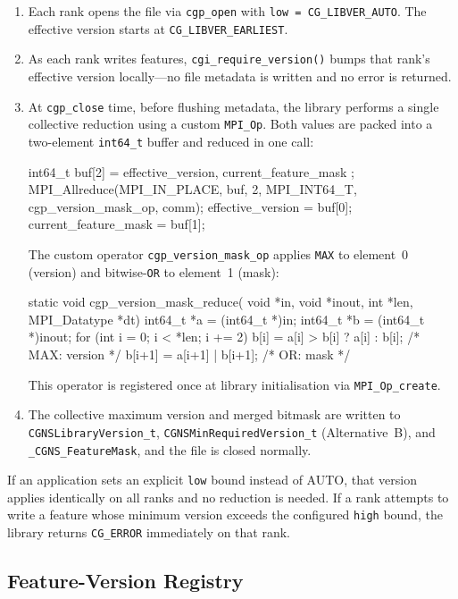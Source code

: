 \documentclass[11pt,letterpaper]{article}
\makeatletter
\let\cgns@orig@lstlisting\lstlisting
\let\cgns@endorig@lstlisting\endlstlisting
\renewenvironment{lstlisting}
  {\par\needspace{5\baselineskip}\nolinenumbers\cgns@orig@lstlisting}
  {\cgns@endorig@lstlisting\par\linenumbers}
\makeatother
\begin{document}
\begin{enumerate}[leftmargin=2em]
\item Each rank opens the file via \texttt{cgp\_open} with
  \texttt{low~=~CG\_LIBVER\_AUTO}.  The effective version starts at
  \texttt{CG\_LIBVER\_EARLIEST}.
\item As each rank writes features, \texttt{cgi\_require\_version()}
  bumps that rank's effective version locally---no file metadata is
  written and no error is returned.
\item At \texttt{cgp\_close} time, before flushing metadata, the
  library performs a single collective reduction using a custom
  \texttt{MPI\_Op}.  Both values are packed into a two-element
  \texttt{int64\_t} buffer and reduced in one call:
\begin{lstlisting}[language=C]
int64_t buf[2] = { effective_version, current_feature_mask };
MPI_Allreduce(MPI_IN_PLACE, buf, 2, MPI_INT64_T,
              cgp_version_mask_op, comm);
effective_version    = buf[0];
current_feature_mask = buf[1];
\end{lstlisting}
  The custom operator \texttt{cgp\_version\_mask\_op} applies
  \texttt{MAX} to element~0 (version) and bitwise-\texttt{OR} to
  element~1 (mask):
\begin{lstlisting}[language=C]
static void cgp_version_mask_reduce(
        void *in, void *inout, int *len, MPI_Datatype *dt)
{
    int64_t *a = (int64_t *)in;
    int64_t *b = (int64_t *)inout;
    for (int i = 0; i < *len; i += 2) {
        b[i]   = a[i]   > b[i] ? a[i] : b[i]; /* MAX: version */
        b[i+1] = a[i+1] | b[i+1];              /* OR:  mask   */
    }
}
\end{lstlisting}
  This operator is registered once at library initialisation via
  \texttt{MPI\_Op\_create}.
\item The collective maximum version and merged bitmask are written to
  \texttt{CGNSLibraryVersion\_t}, \texttt{CGNSMinRequiredVersion\_t}
  (Alternative~B), and \texttt{\_CGNS\_FeatureMask}, and the file is
  closed normally.
\end{enumerate}

If an application sets an explicit \texttt{low} bound instead of
AUTO, that version applies identically on all ranks and no reduction
is needed.  If a rank attempts to write a feature whose minimum
version exceeds the configured \texttt{high} bound, the library
returns \texttt{CG\_ERROR} immediately on that rank.

\subsection{Feature-Version Registry}
\label{sec:feature-registry}
\end{document}
